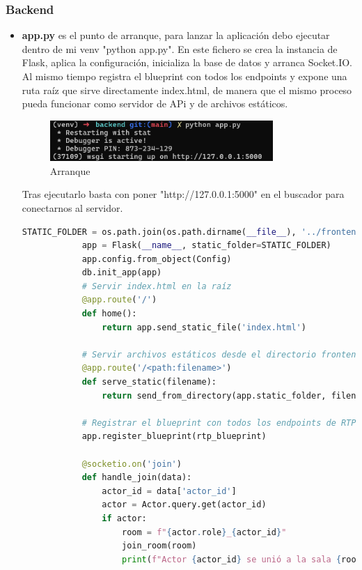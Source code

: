 \subsubsection{Backend}
\label{subsubsec:Backend}

\begin{itemize}
    \item \textbf{app.py} es el punto de arranque, para lanzar la aplicación debo ejecutar dentro de mi venv "python app.py". En este fichero se crea la instancia de Flask, aplica la configuración, inicializa la base de datos y arranca Socket.IO. Al mismo tiempo registra el blueprint con todos los endpoints y expone una ruta raíz que sirve directamente index.html, de manera que el mismo proceso pueda funcionar como servidor de APi y de archivos estáticos. 
        \begin{figure}[H]
            \centering
            \includegraphics[width=0.8\textwidth]{Imagenes/Arranque1.png}
            \caption{Arranque}
            \label{fig:Arranque}
        \end{figure}
        Tras ejecutarlo basta con poner "http://127.0.0.1:5000"     en el buscador para conectarnos al servidor.


        \begin{lstlisting}[language=Python, style=custom]
            STATIC_FOLDER = os.path.join(os.path.dirname(__file__), '../frontend')
            app = Flask(__name__, static_folder=STATIC_FOLDER)
            app.config.from_object(Config)
            db.init_app(app)
            # Servir index.html en la raíz
            @app.route('/')
            def home():
                return app.send_static_file('index.html')

            # Servir archivos estáticos desde el directorio frontend
            @app.route('/<path:filename>')
            def serve_static(filename):
                return send_from_directory(app.static_folder, filename)

            # Registrar el blueprint con todos los endpoints de RTP
            app.register_blueprint(rtp_blueprint)

            @socketio.on('join')
            def handle_join(data):
                actor_id = data['actor_id']
                actor = Actor.query.get(actor_id)
                if actor:
                    room = f"{actor.role}_{actor_id}"
                    join_room(room)
                    print(f"Actor {actor_id} se unió a la sala {room}")


\end{lstlisting}
\end{itemize}
